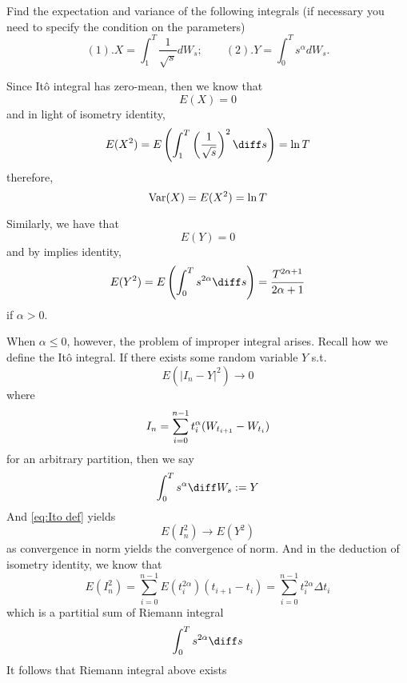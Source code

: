     \problem
    \begin{question}
        Find the expectation and variance of the following integrals
        (if necessary you need to specify the condition on the parameters)
        \[(1).  X=\int_1^T \frac{1}{\sqrt s}dW_s; \quad \quad (2).  Y= \int_0^T s^\alpha dW_s.\]
    \end{question}
    \begin{subproblem}[(\arabic*).]
        \item
        Since It\^o integral has zero-mean, then
        we know that
        \[E(X)=0\]
        and in light of isometry identity,
        \[E(X^2)=E\left(\int_1^T\left(\frac{1}{\sqrt s}\right)^2
        \diff s\right)=\ln T\]
        therefore,
        \[\mathrm{Var}(X)=E(X^2)=\ln T\]

        \item
        Similarly, we have that
        \[E(Y)=0\]
        and by implies identity,
        \[E(Y^2)=E\left(\int_0^Ts^{2\alpha}\diff s\right)
        =\frac{T^{2\alpha+1}}{2\alpha+1}\]
        if $\alpha>0$.

        When $\alpha\leq 0$, however,
        the problem of improper integral arises.
        Recall how we define the It\^o integral.
        If there exists some random variable $Y$ s.t.
        \begin{equation}
            \label{eq:Ito def}
            E(|I_n-Y|^2)\to 0
        \end{equation}
        where
        \[I_n=\sum_{i=0}^{n-1}t_i^\alpha(W_{t_{i+1}}-W_{t_i})\]
        for an arbitrary partition,
        then we say
        \[\int_0^Ts^\alpha\diff W_s:=Y\]
        And \cref{eq:Ito def} yields
        \[E(I_n^2)\to E(Y^2)\]
        as convergence in norm yields the convergence of norm.
        And in the deduction of isometry identity, we know that
        \[E(I_n^2)=\sum_{i=0}^{n-1}E(t_i^{2\alpha})(t_{i+1}-t_i)
        =\sum_{i=0}^{n-1}t_i^{2\alpha}\Delta t_i\]
        which is a partitial sum of Riemann integral
        \begin{equation}
            \label{eq:Riemann int}
            \int_0^Ts^{2\alpha}\diff s
        \end{equation}
        It follows that Riemann integral above exists
\end{subproblem}
